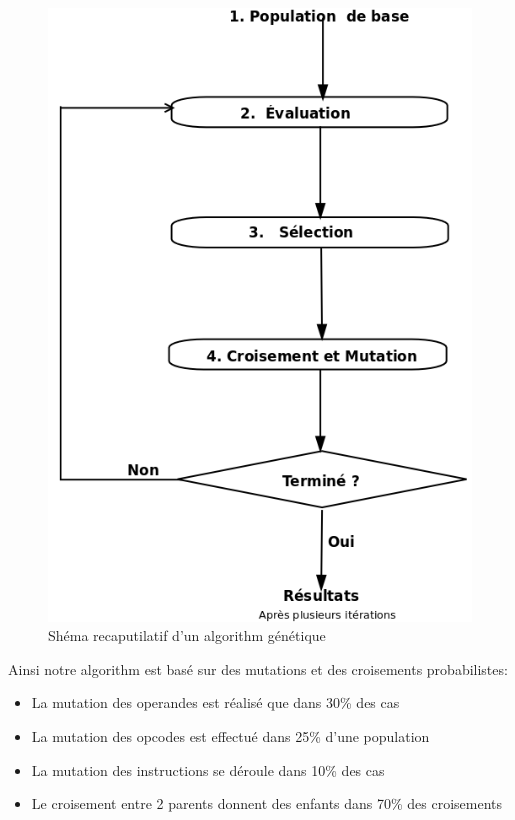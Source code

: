\documentclass[12pt]{article}
\begin{document}
\begin{figure}[h!]
	\center
	\includegraphics[scale=0.3]{Images/schema_recaputilatif_algorithm_genetique.png}
	\caption{Shéma recaputilatif d'un algorithm génétique}
\end{figure}

\newpage
Ainsi notre algorithm est basé sur des mutations et des croisements probabilistes:

\begin{itemize}
	\item La mutation des operandes est réalisé que dans 30\% des cas
	\item La mutation des opcodes est effectué dans 25\% d'une population
	\item La mutation des instructions se déroule dans 10\% des cas
	\item Le croisement entre 2 parents donnent des enfants dans 70\% des croisements
\end{itemize}
\end{document}
